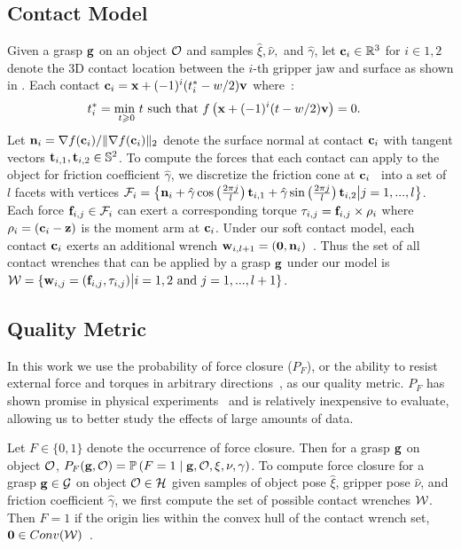 \subsection{Contact Model}
Given a grasp $\mathbf{g}$ on an object $\mathcal{O}$ and samples $\hat{\xi}, \hat{\nu},$ and $\hat{\gamma}$, let $\mathbf{c}_i \in \mathbb{R}^3$ for $i \in {1, 2}$ denote the 3D contact location between the $i$-th gripper jaw and surface as shown in .
Each contact $\mathbf{c}_i = \mathbf{x} + (-1)^{i} (t_i^* - w / 2) \mathbf{v}$ where~\cite{mahler2015gp}:
\begin{align*}
	t_i^* &= \underset{t \geqslant 0}{\text{min }} t \text{ such that } f\left(\mathbf{x} +  (-1)^{i} (t - w / 2) \mathbf{v}\right) = 0.
\end{align*}
\noindent Let $\mathbf{n}_i = \nabla f(\mathbf{c}_i) / \| \nabla f(\mathbf{c}_i) \|_2$ denote the surface normal at contact $\mathbf{c}_i$ with tangent vectors $\mathbf{t}_{i,1}, \mathbf{t}_{i,2} \in \mathbb{S}^2$.
To compute the forces that each contact can apply to the object for friction coefficient $\hat{\gamma}$, we discretize the friction cone at $\mathbf{c}_i$~\cite{pokorny2013c} into a set of $l$ facets with vertices $\mathcal{F}_{i} = \left\{ \mathbf{n}_i + \hat{\gamma} \cos \left( \frac{2 \pi j}{l} \right) \mathbf{t}_{i,1} + \hat{\gamma} \sin \left( \frac{2 \pi j}{l} \right) \mathbf{t}_{i,2} \big| j = 1, ..., l \right\}$.
Each force $\mathbf{f}_{i,j} \in \mathcal{F}_{i}$ can exert a corresponding torque $\tau_{i,j} = \mathbf{f}_{i,j} \times \rho_i$ where $\rho_i = (\mathbf{c}_i - \mathbf{z})$ is the moment arm at $\mathbf{c}_i$.
Under our soft contact model, each contact $\mathbf{c}_i$ exerts an additional wrench $\mathbf{w}_{i,l+1} = (\mathbf{0}, \mathbf{n}_i)$~\cite{zheng2005}.
Thus the set of all contact wrenches that can be applied by a grasp $\mathbf{g}$ under our model is $\mathcal{W} = \{ \mathbf{w}_{i,j} = (\mathbf{f}_{i,j}, \tau_{i,j}) \big| i = 1, 2 \text{ and } j = 1, ..., l+1\}$.

\subsection{Quality Metric}
In this work we use the probability of force closure ($P_F$), or the ability to resist external force and torques in arbitrary directions~\cite{mahler2015gp}, as our quality metric.
$P_F$ has shown promise in physical experiments~\cite{kim2012physically, weisz2012pose} and is relatively inexpensive to evaluate, allowing us to better study the effects of large amounts of data.

Let $F \in \{0, 1\}$ denote the occurrence of force closure.
Then for a grasp $\mathbf{g}$ on object $\mathcal{O}$, $P_F(\mathbf{g}, \mathcal{O}) = \mathbb{P}\left(F = 1 \mid \mathbf{g}, \mathcal{O}, \xi, \nu, \gamma \right)$.
To compute force closure for a grasp $\mathbf{g} \in \mathcal{G}$ on object $\mathcal{O} \in \mathcal{H}$ given samples of object pose $\hat{\xi}$, gripper pose $\hat{\nu}$, and friction coefficient $\hat{\gamma}$, we first compute the set of possible contact wrenches $\mathcal{W}$.
Then $F = 1$ if the origin lies within the convex hull of the contact wrench set, $\mathbf{0} \in Conv(\mathcal{W})$~\cite{weisz2012pose}.

